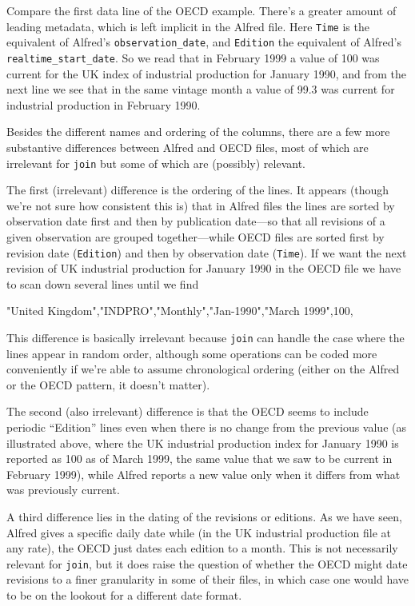 Compare the first data line of the OECD example. There's a greater
amount of leading metadata, which is left implicit in the Alfred
file. Here \texttt{Time} is the equivalent of Alfred's
\verb|observation_date|, and \texttt{Edition} the equivalent of
Alfred's \verb|realtime_start_date|. So we read that in February 1999
a value of 100 was current for the UK index of industrial production
for January 1990, and from the next line we see that in the same
vintage month a value of 99.3 was current for industrial production in
February 1990.

Besides the different names and ordering of the columns, there are a
few more substantive differences between Alfred and OECD files, most
of which are irrelevant for \texttt{join} but some of which are
(possibly) relevant.

The first (irrelevant) difference is the ordering of the lines. It
appears (though we're not sure how consistent this is) that in Alfred
files the lines are sorted by observation date first and then by
publication date---so that all revisions of a given observation are
grouped together---while OECD files are sorted first by revision date
(\texttt{Edition}) and then by observation date (\texttt{Time}). If we
want the next revision of UK industrial production for January 1990 in
the OECD file we have to scan down several lines until we find
\begin{code}
"United Kingdom","INDPRO","Monthly","Jan-1990","March 1999",100,
\end{code}
This difference is basically irrelevant because \texttt{join} can
handle the case where the lines appear in random order, although some
operations can be coded more conveniently if we're able to assume
chronological ordering (either on the Alfred or the OECD pattern, it
doesn't matter).

The second (also irrelevant) difference is that the OECD seems to
include periodic ``Edition'' lines even when there is no change from
the previous value (as illustrated above, where the UK industrial
production index for January 1990 is reported as 100 as of March
1999, the same value that we saw to be current in February 1999),
while Alfred reports a new value only when it differs from what was
previously current.

A third difference lies in the dating of the revisions or editions.
As we have seen, Alfred gives a specific daily date while (in the UK
industrial production file at any rate), the OECD just dates each
edition to a month. This is not necessarily relevant for
\texttt{join}, but it does raise the question of whether the OECD
might date revisions to a finer granularity in some of their files, in
which case one would have to be on the lookout for a different date
format.

